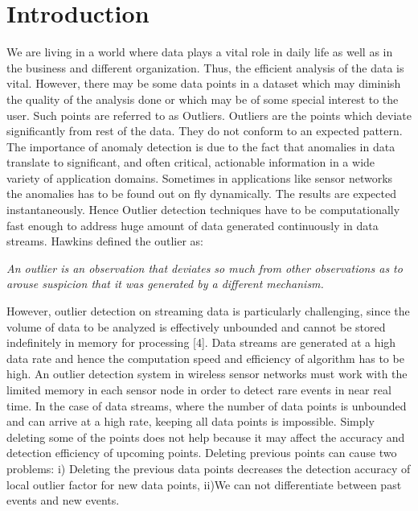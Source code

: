 \chapter{Introduction}

We are living in a world where data plays a vital role in daily life as well as in the
business and different organization. Thus, the efficient analysis of the data is vital.
However, there may be some data points in a dataset which may diminish the quality
of the analysis done or which may be of some special interest to the user. Such
points are referred to as Outliers. Outliers are the points which deviate significantly from rest of the data. They do not conform to an expected pattern. The importance of anomaly detection is due to the fact that anomalies in data translate
to significant, and often critical, actionable information in a wide variety of application
domains. Sometimes in applications like sensor networks the anomalies has to be found out on fly dynamically. The results are expected instantaneously. Hence Outlier detection techniques have to be computationally fast enough to address huge amount of data generated continuously in data streams.  Hawkins
\cite{hawkins} defined the outlier as:

\par 
\textit{An outlier is an observation that deviates so much from other observations as to
	arouse suspicion that it was generated by a different mechanism.}
 
	 However, outlier detection on streaming data is particularly
challenging, since the volume of data to be analyzed is
effectively unbounded and cannot be stored indefinitely in
memory for processing [4]. Data streams are generated at a high data rate and hence the computation speed and efficiency of algorithm has to be high. An outlier detection system in wireless sensor
networks must work with the limited memory in each
sensor node in order to detect rare events in near real time. In the
case of data streams, where the number of data points is
unbounded and can arrive at a high rate, keeping all data
points is impossible. Simply deleting some of the points does not help because it may affect the accuracy and detection efficiency of upcoming points. Deleting previous points can cause two problems: i) Deleting the previous data points decreases the detection accuracy of local outlier factor for new data points, ii)We can not differentiate between past events and new events. 


